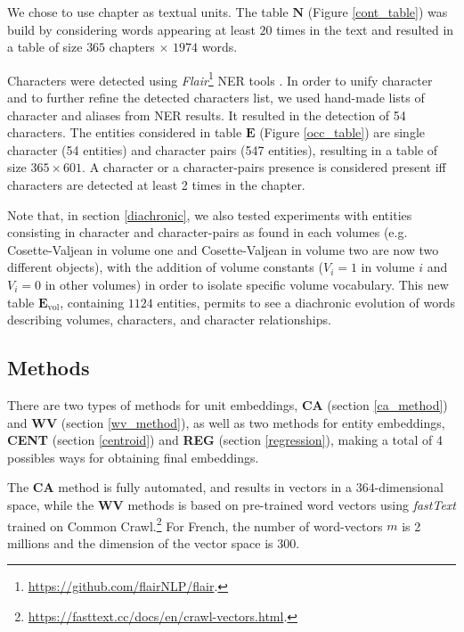 \documentclass[
twocolumn,
]{ceurart}
\begin{document}
We chose to use chapter as textual units. The table $\mathbf{N}$ (Figure \ref{cont_table}) was build by considering words appearing at least $20$ times in the text and resulted in a table of size $365$ chapters $\times$ $1974$ words.

Characters were detected using \emph{Flair}\footnote{\url{https://github.com/flairNLP/flair}.} NER tools \cite{Akbik2018}. In order to unify character and to further refine the detected characters list, we used hand-made lists of character and aliases from NER results. It resulted in the detection of 54 characters. The entities considered in table $\mathbf{E}$ (Figure \ref{occ_table}) are single character (54 entities) and character pairs (547 entities), resulting in a table of size $365 \times 601$. A character or a character-pairs presence is considered present iff characters are detected at least 2 times in the chapter. 

Note that, in section \ref{diachronic}, we also tested experiments with entities consisting in character and character-pairs as found in each volumes (e.g. Cosette-Valjean in volume one and Cosette-Valjean in volume two are now two different objects), with the addition of volume constants ($V_i=1$ in volume $i$ and $V_i=0$ in other volumes) in order to isolate specific volume vocabulary. This new table $\mathbf{E}_\text{vol}$, containing $1124$ entities, permits to see a diachronic evolution of words describing volumes, characters, and character relationships. 

\subsection{Methods}

There are two types of methods for unit embeddings, \textbf{CA} (section \ref{ca_method}) and \textbf{WV} (section \ref{wv_method}), as well as two methods for entity embeddings, \textbf{CENT} (section \ref{centroid}) and \textbf{REG} (section \ref{regression}), making a total of 4 possibles ways for obtaining final embeddings. 

The \textbf{CA} method is fully automated, and results in vectors in a $364$-dimensional space, while the $\textbf{WV}$ methods is based on pre-trained word vectors using \emph{fastText} \cite{Bojanowski2017} trained on Common Crawl.\footnote{\url{ https://fasttext.cc/docs/en/crawl-vectors.html}.} For French, the number of word-vectors $m$ is 2 millions and the dimension of the vector space is $300$. 
\end{document}
